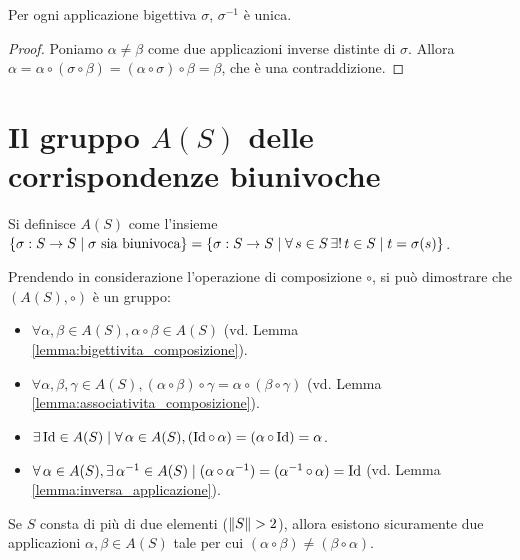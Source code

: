 \begin{lemma}
    Per ogni applicazione bigettiva $\sigma$, $\sigma^{-1}$ è unica.
\end{lemma}

\begin{proof}
    Poniamo $\alpha \neq \beta$ come due applicazioni inverse distinte
    di $\sigma$. Allora $\alpha = \alpha \circ (\sigma \circ \beta) =
    (\alpha \circ \sigma) \circ \beta = \beta$, che è una contraddizione.
\end{proof}

\section{Il gruppo \texorpdfstring{$A(S)$}{A(S)} delle corrispondenze biunivoche}

Si definisce $A(S)$ come l'insieme $\{\sigma : S \to S \mid \sigma \text{ sia biunivoca}\} =
\{\sigma : S \to S \mid \forall s \in S \existsone t \in S \mid t = \sigma(s)\}$.

Prendendo in considerazione l'operazione di composizione $\circ$, si può dimostrare
che $(A(S), \circ)$ è un gruppo:

\begin{itemize}
    \item $\forall \alpha, \beta \in A(S), \alpha \circ \beta \in A(S)$ (vd. Lemma \ref{lemma:bigettivita_composizione}).
    \item $\forall \alpha, \beta, \gamma \in A(S), (\alpha \circ \beta) \circ \gamma = \alpha \circ (\beta \circ \gamma)$ (vd. Lemma \ref{lemma:associativita_composizione}).
    \item $\exists \Id \in A(S) \mid \forall \alpha \in A(S), (\Id \circ \alpha) = (\alpha \circ \Id) = \alpha$.
    \item $\forall \alpha \in A(S), \exists \alpha^{-1} \in A(S) \mid (\alpha \circ \alpha^{-1}) = (\alpha^{-1} \circ \alpha) = \Id$ (vd. Lemma \ref{lemma:inversa_applicazione}).
\end{itemize}

\begin{lemma}
    Se $S$ consta di più di due elementi ($\lVert S \rVert > 2$), allora esistono sicuramente
    due applicazioni $\alpha, \beta \in A(S)$ tale per cui $(\alpha \circ \beta) \neq
    (\beta \circ \alpha)$.
\end{lemma}

